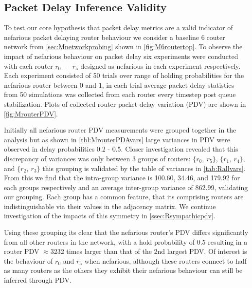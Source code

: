 \subsection{Packet Delay Inference Validity}
To test our core hypothesis that packet delay metrics are a valid indicator of nefarious packet delaying router behaviour we consider a baseline 6 router network from \cref{sec:Mnetworkprobing} shown in \cref{fig:M6routertop}. To observe the impact of nefarious behaviour on packet delay six experiments were conducted with each router $r_0\ -\ r_5$ designed as nefarious in each experiment respectively. Each experiment consisted of 50 trials over range of holding probabilities for the nefarious router between 0 and 1, in each trial average packet delay statistics from 50 simulations was collected from each router every timestep post queue stabilization. Plots of collected router packet delay variation (PDV) are shown in \ref{fig:MrouterPDV}.\par
Initially all nefarious router PDV measurements were grouped together in the analysis but as shown in \cref{tbl:MrouterPDAvars} large variances in PDV were observed in delay probabilities 0.2 - 0.5. Closer investigation revealed that this discrepancy of variances was only between 3 groups of routers: $\{r_0,\ r_5\}$, $\{r_1,\ r_4\}$, and $\{r_2,\ r_3\}$ this grouping is validated by the table of variances in \cref{tab:Rallvars}. From this we find that the intra-group variance is 100.60, 34.46, and 179.92 for each groups respectively and an average inter-group variance of 862.99, validating our grouping. Each group has a common feature, that its comprising routers are indistinguishable via their values in the adjacency matrix. We continue investigation of the impacts of this symmetry in \cref{ssec:Rsympathicpdv}.\par
Using these grouping its clear that the nefarious router's PDV differs significantly from all other routers in the network, with a hold probability of 0.5 resulting in a router PDV $\approx$3232 times larger than that of the 2nd largest PDV. Of interest is the behaviour of $r_0$ and $r_5$ when nefarious, although these routers connect to half as many routers as the others they exhibit their nefarious behaviour can still be inferred through PDV.\par

